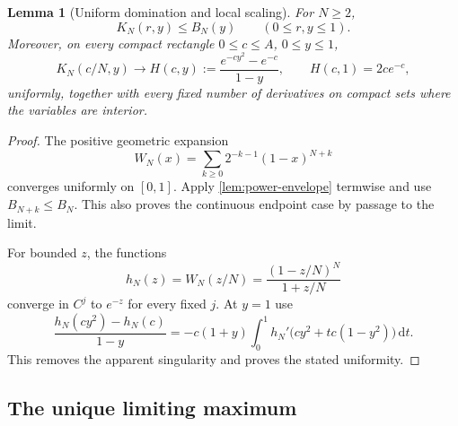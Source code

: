 \documentclass[11pt]{article}
\numberwithin{equation}{section}
\newtheorem{lemma}[theorem]{Lemma}
\theoremstyle{definition}
\theoremstyle{remark}
\newcommand{\dd}{\,\mathrm d}
\begin{document}
\begin{lemma}[Uniform domination and local scaling]\label{lem:kernel-scale}
For $N\ge2$,
\begin{equation}\label{eq:kernel-envelope}
 K_N(r,y)\le B_N(y)\qquad(0\le r,y\le1).
\end{equation}
Moreover, on every compact rectangle $0\le c\le A$, $0\le y\le1$,
\begin{equation}\label{eq:kernel-limit}
 K_N(c/N,y)\longrightarrow
 H(c,y):=\frac{e^{-cy^2}-e^{-c}}{1-y},\qquad H(c,1)=2ce^{-c},
\end{equation}
uniformly, together with every fixed number of derivatives on compact
sets where the variables are interior.
\end{lemma}
\begin{proof}
The positive geometric expansion
\[
 W_N(x)=\sum_{k\ge0}2^{-k-1}(1-x)^{N+k}
\]
converges uniformly on $[0,1]$. Apply \cref{lem:power-envelope}
termwise and use $B_{N+k}\le B_N$. This also proves the continuous
endpoint case by passage to the limit.

For bounded $z$, the functions
\[
 h_N(z)=W_N(z/N)=\frac{(1-z/N)^N}{1+z/N}
\]
converge in $C^j$ to $e^{-z}$ for every fixed $j$. At $y=1$ use
\[
 \frac{h_N(cy^2)-h_N(c)}{1-y}
 =-c(1+y)\int_0^1 h_N'\bigl(cy^2+t c(1-y^2)\bigr)\dd t.
\]
This removes the apparent singularity and proves the stated uniformity.
\end{proof}

\subsection{The unique limiting maximum}
\end{document}
